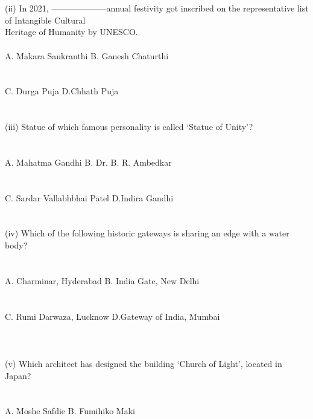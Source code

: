 \documentclass[10pt]{article}
\begin{document}
%
\\ \\
(ii) In 2021, --------------------annual festivity got inscribed on the representative list of
Intangible Cultural \\
\hspace*{4ex}Heritage of Humanity by UNESCO. 
\\
%
\\
\hspace*{4ex}A. Makara Sankranthi \tab B. Ganesh Chaturthi \\ \\ \\
\hspace*{4ex}C. Durga Puja \tab D.Chhath Puja 
\\ \\
%
\\
(iii) Statue of which famous personality is called ‘Statue of Unity’? 
 \\ 
\\
%
\\
\hspace*{4ex}A. Mahatma Gandhi  \tab B. Dr. B. R. Ambedkar  
 \\ \\ \\
\hspace*{4ex}C. Sardar Vallabhbhai Patel   \tab D.Indira Gandhi 
\\ \\
%
\\
(iv) Which of the following historic gateways is sharing an edge with a water body? \\ 
\\
%
\\
\hspace*{4ex}A. Charminar, Hyderabad \tab B. India Gate, New Delhi \\ \\ \\
\hspace*{4ex}C. Rumi Darwaza, Lucknow  \tab D.Gateway of India, Mumbai 
\\ \\
%
\\ \\
(v) Which architect has designed the building ‘Church of Light’, located in Japan? 
 \\ 
\\
%
\\
\hspace*{4ex}A. Moshe Safdie \tab B. Fumihiko Maki 
 \\ \\ \\
\end{document}
